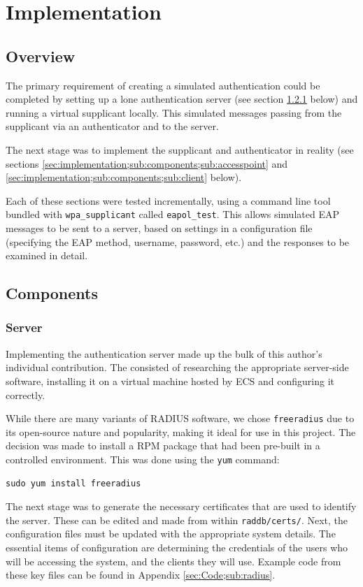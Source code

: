 \documentclass[12pt,a4paper,titlepage]{article}
\begin{document}
\newpage
\section{Implementation}

\subsection{Overview}
The primary requirement of creating a simulated authentication could be completed by setting up a lone authentication server (see section \ref{sec:implementation;sub:components;sub:server} below) and running a virtual supplicant locally. This simulated messages passing from the supplicant via an authenticator and to the server.

The next stage was to implement the supplicant and authenticator in reality (see sections \ref{sec:implementation;sub:components;sub:accesspoint} and \ref{sec:implementation;sub:components;sub:client} below).

Each of these sections were tested incrementally, using a command line tool bundled with \texttt{wpa\_supplicant} called \texttt{eapol\_test}. This allows simulated EAP messages to be sent to a server, based on settings in a configuration file (specifying the EAP method, username, password, etc.) and the responses to be examined in detail.

\subsection{Components}

\subsubsection{Server}
\label{sec:implementation;sub:components;sub:server}
Implementing the authentication server made up the bulk of this author's individual contribution. The consisted of researching the appropriate server-side software, installing it on a virtual machine hosted by ECS and configuring it correctly. 

While there are many variants of RADIUS software, we chose \texttt{freeradius} due to its open-source nature and popularity, making it ideal for use in this project. The decision was made to install a RPM package that had been pre-built in a controlled environment. This was done using the \texttt{yum} command:
\begin{verbatim}
sudo yum install freeradius
\end{verbatim}
The next stage was to generate the necessary certificates that are used to identify the server. These can be edited and made from within \texttt{raddb/certs/}. Next, the configuration files must be updated with the appropriate system details. The essential items of configuration are determining the credentials of the users who will be accessing the system, and the clients they will use. Example code from these key files can be found in Appendix \ref{sec:Code;sub:radius}.
\end{document}
